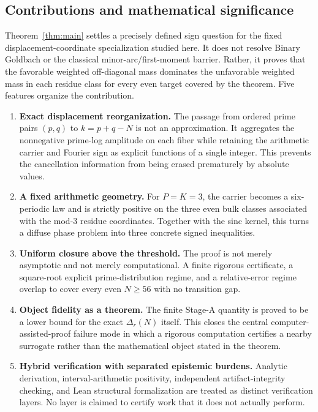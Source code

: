 \documentclass[11pt]{article}
\theoremstyle{definition}
\begin{document}
\subsection{Contributions and mathematical significance}\label{sec:significance-intro}

Theorem~\ref{thm:main} settles a precisely defined sign question for the fixed displacement-coordinate specialization studied here. It does not resolve Binary Goldbach or the classical minor-arc/first-moment barrier. Rather, it proves that the favorable weighted off-diagonal mass dominates the unfavorable weighted mass in each residue class for every even target covered by the theorem. Five features organize the contribution.

\begin{enumerate}
\item \textbf{Exact displacement reorganization.} The passage from ordered prime pairs $(p,q)$ to $k=p+q-N$ is not an approximation. It aggregates the nonnegative prime-log amplitude on each fiber while retaining the arithmetic carrier and Fourier sign as explicit functions of a single integer. This prevents the cancellation information from being erased prematurely by absolute values.
\item \textbf{A fixed arithmetic geometry.} For $P=K=3$, the carrier becomes a six-periodic law and is strictly positive on the three even bulk classes associated with the mod-$3$ residue coordinates. Together with the sinc kernel, this turns a diffuse phase problem into three concrete signed inequalities.
\item \textbf{Uniform closure above the threshold.} The proof is not merely asymptotic and not merely computational. A finite rigorous certificate, a square-root explicit prime-distribution regime, and a relative-error regime overlap to cover every even $N\ge56$ with no transition gap.
\item \textbf{Object fidelity as a theorem.} The finite Stage-A quantity is proved to be a lower bound for the exact $\Delta_r(N)$ itself. This closes the central computer-assisted-proof failure mode in which a rigorous computation certifies a nearby surrogate rather than the mathematical object stated in the theorem.
\item \textbf{Hybrid verification with separated epistemic burdens.} Analytic derivation, interval-arithmetic positivity, independent artifact-integrity checking, and Lean structural formalization are treated as distinct verification layers. No layer is claimed to certify work that it does not actually perform.
\end{enumerate}
\end{document}
